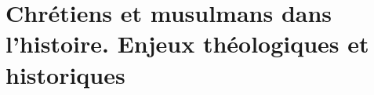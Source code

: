 \documentclass[oneside,10pt]{book}
\begin{document}
 







\setcounter{page}{1}
 



%
%

% 
%
%
%

%
%
%
% 
%
%
%
%
%
%
%  
%  

%
%
%
%
%
%
%


 \part{Chrétiens et musulmans dans l'histoire. Enjeux théologiques et historiques}






\end{document}
